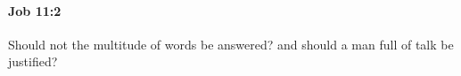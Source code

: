 
		\paragraph{Job 11:2} %
			\label{JOB-11-2}

			Should not the multitude of words be answered? and should a man full of talk be justified?


